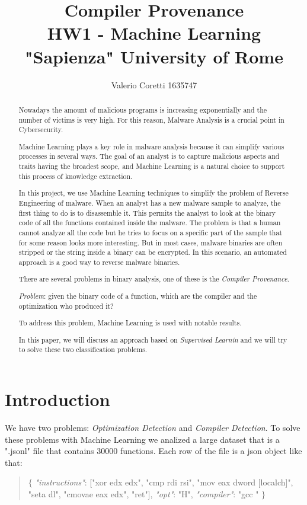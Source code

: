 \documentclass[12pt]{article}
\title{{\bf Compiler Provenance} \\ \bigskip \large HW1 - Machine Learning \\ \large "Sapienza" University of Rome}
\author{Valerio Coretti 1635747}
\begin{document}
\maketitle

\begin{abstract}

Nowadays the amount of malicious programs is increasing exponentially and the number of victims is very high. For this reason, Malware Analysis is a crucial point in Cybersecurity.

Machine Learning plays a key role in malware analysis because it can simplify various processes in several ways. The goal of an analyst is to capture malicious aspects and traits having the broadest scope, and Machine Learning is a natural choice to support this process of knowledge extraction.

In this project, we use Machine Learning techniques to simplify the problem of Reverse Engineering of malware. When an analyst has a new malware sample to analyze, the first thing to do is to disassemble it. This permits the analyst to look at the binary code of all the functions contained inside the malware. The problem is that a human cannot analyze all the code but he tries to focus on a specific part of the sample that for some reason looks more interesting. But in most cases, malware binaries are often stripped or the string inside a binary can be encrypted. In this scenario, an automated approach is a good way to reverse malware binaries.

There are several problems in binary analysis, one of these is the {\em Compiler Provenance}.

{\em Problem}: given the binary code of a function, which are the compiler and the optimization who produced it?

To address this problem, Machine Learning is used with notable results.

In this paper, we will discuss an approach based on {\em Supervised Learnin} and we will try to solve these two classification problems.

\end{abstract}

\section{Introduction}
We have two problems: {\em Optimization Detection} and {\em Compiler Detection}.
To solve these problems with Machine Learning we analized a large dataset that is a ".jsonl" file that contains 30000 functions. Each row of the file is a json object like that:
\begin{quote}
$\{$
 \newline
 {\em "instructions"}: ["xor edx edx", "cmp rdi rsi", "mov eax dword [localch]", "seta dl", "cmovae eax edx", "ret"],
 \newline
 {\em "opt"}: "H",
 \newline
 {\em "compiler"}: "gcc "
 \newline
$\}$
\end{quote}
\end{document}
